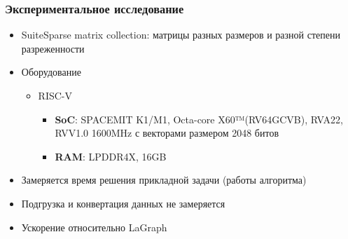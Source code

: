 \documentclass[xcolor=table,aspectratio=169]{beamer}
\begin{document}
\begin{frame}[t]
  \frametitle{Экспериментальное исследование}
  \begin{itemize}
    \item SuiteSparse matrix collection: матрицы разных размеров и разной степени разреженности
    \item Оборудование
    \begin{itemize}
    \item RISC-V
    \begin{itemize}
      \item \textbf{SoC}: SPACEMIT K1/M1, Octa-core X60™(RV64GCVB), RVA22, RVV1.0 1600MHz с векторами размером 2048 битов 
      \item \textbf{RAM}: LPDDR4X, 16GB 
    \end{itemize}
    \end{itemize}
    \item Замеряется время решения прикладной задачи (работы алгоритма)
    \item Подгрузка и конвертация данных не замеряется
    \item Ускорение относительно LaGraph
  \end{itemize}  
\end{frame}
\end{document}
